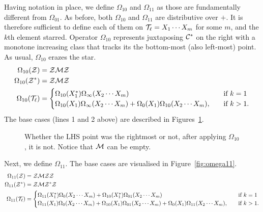 \message{ !name(thesis.tex)}\documentclass[12pt, a4paper, twoside]{report}
\begin{document}
Having notation in place, we define $\Omega_{10}$ and $\Omega_{11}$ as those are fundamentally different from $\Omega_{01}$. As before, both $\Omega_{10}$ and $\Omega_{11}$ are distributive over $+$. It is therefore sufficient to define each of them on $\mathcal{T}_\ell = X_1\cdots X_m$ for some $m$, and the $k$th element starred. Operator $\Omega_{10}$ represents juxtaposing $\mathcal{C}^*$ on the right with a monotone increasing class that tracks its the bottom-most (also left-most) point. As usual, $\Omega_{10}$ erazes the star.
\begin{align*}
  \Omega_{10}(\mathcal{Z}) &= \mathcal{Z}\mathcal{M}\mathcal{Z}\\
  \Omega_{10}(\mathcal{Z}^*) &= \mathcal{Z}\mathcal{M}\mathcal{Z}\\
  \Omega_{10}(\mathcal{T}_\ell) &=
                      \begin{cases}
                        \Omega_{10}(X_1^*)\Omega_\infty(X_2\cdots X_m) \quad &\text{if $k = 1$}\\
                        \Omega_{10}(X_1)\Omega_\infty(X_2\cdots X_m) + \Omega_0(X_1)\Omega_{10}(X_2\cdots X_m),\quad &\text{if $k>1$.}
                      \end{cases}
\end{align*}
The base cases (lines 1 and 2 above) are described in Figures~\ref{fig:omega_10}. 
\begin{figure}[ht]
    \centering
    \caption{Whether the LHS point was the rightmost or not, after applying $\Omega_{10}$, it is not. Notice that $\mathcal{M}$ can be empty.}
    \label{fig:omega_10}
\end{figure}
Next, we define $\Omega_{11}$. The base cases are visualised in Figure~\ref{fig:omega11}.
\begin{align*}
  \Omega_{11}(\mathcal{Z}) &= \mathcal{Z}\mathcal{M}\mathcal{Z}\mathcal{Z}\\
  \Omega_{11}(\mathcal{Z}^*) &= \mathcal{Z}\mathcal{M}\mathcal{Z}^*\mathcal{Z}\\
  \Omega_{11}(\mathcal{T}_\ell) &=
                      \begin{cases}
                        \Omega_{11}(X_1^*)\Omega_0(X_2\cdots X_m)+\Omega_{10}(X_1^*)\Omega_{01}(X_2\cdots X_m) \quad &\text{if $k = 1$}\\
                        \Omega_{11}(X_1)\Omega_0(X_2\cdots X_m) + \Omega_{10}(X_1)\Omega_{01}(X_2\cdots X_m) + \Omega_0(X_1)\Omega_{11}(X_2\cdots X_m),\quad &\text{if $k>1$.}
                      \end{cases}
\end{align*}
\end{document}
